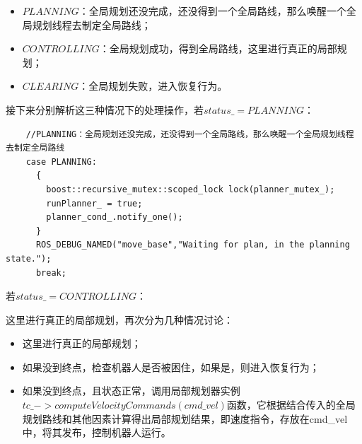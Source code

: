 \documentclass[9pt, oneside]{book}
\begin{document}
\begin{itemize}
    \item $PLANNING$：全局规划还没完成，还没得到一个全局路线，那么唤醒一个全局规划线程去制定全局路线；
    \item $CONTROLLING$：全局规划成功，得到全局路线，这里进行真正的局部规划；
    \item $CLEARING$：全局规划失败，进入恢复行为。
\end{itemize}

接下来分别解析这三种情况下的处理操作，若$status\_=PLANNING$：

\footnotesize
\begin{verbatim}
    //PLANNING：全局规划还没完成，还没得到一个全局路线，那么唤醒一个全局规划线程去制定全局路线
    case PLANNING:
      {
        boost::recursive_mutex::scoped_lock lock(planner_mutex_);
        runPlanner_ = true;
        planner_cond_.notify_one();
      }
      ROS_DEBUG_NAMED("move_base","Waiting for plan, in the planning state.");
      break;
\end{verbatim}
\normalsize

若$status\_=CONTROLLING$：

这里进行真正的局部规划，再次分为几种情况讨论：

\begin{itemize}
    \item 这里进行真正的局部规划；
    \item 如果没到终点，检查机器人是否被困住，如果是，则进入恢复行为；
    \item 如果没到终点，且状态正常，调用局部规划器实例$tc\_->computeVelocityCommands(cmd\_vel)$函数，它根据结合传入的全局规划路线和其他因素计算得出局部规划结果，即速度指令，存放在cmd\_vel中，将其发布，控制机器人运行。
\end{itemize}
\end{document}
